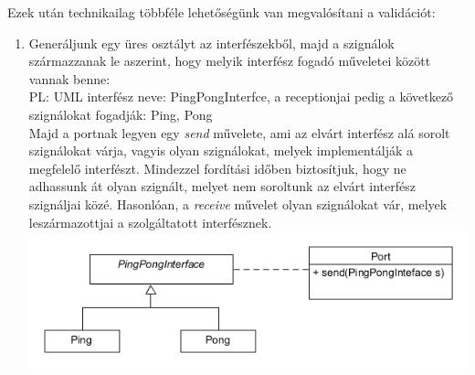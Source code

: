 \documentclass[a4paper,12pt]{report}
\begin{document}
%

Ezek után technikailag többféle lehetőségünk van megvalósítani a validációt: \\
\begin{enumerate}

\item Generáljunk egy üres osztályt az interfészekből, majd a szignálok származzanak le aszerint, hogy melyik interfész fogadó műveletei között vannak benne: \\
PL: UML interfész neve: PingPongInterfce, a receptionjai pedig a következő szignálokat fogadják: Ping, Pong \\
Majd a portnak legyen egy \textit{send} művelete, ami az elvárt interfész alá sorolt szignálokat várja, vagyis olyan szignálokat, melyek implementálják a megfelelő interfészt.
Mindezzel fordítási időben biztosítjuk, hogy ne adhassunk át olyan szignált, melyet nem soroltunk az elvárt interfész szignáljai közé. Hasonlóan, a \textit{receive} művelet olyan szignálokat vár, melyek leszármazottjai a szolgáltatott interfésznek. \\

\includegraphics[scale=0.7]{inf_ver1.png} \\


\end{enumerate}
\end{document}
